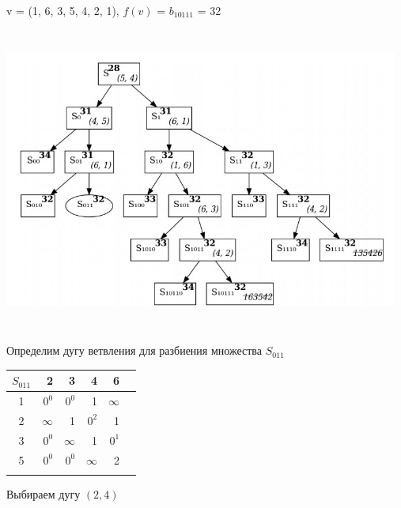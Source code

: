 \documentclass[12pt]{article}
\begin{document}
v = (1, 6, 3, 5, 4, 2, 1), $f(v)$ = $b_{10111}$  = 32\\
\begin{flushleft}
 
\includegraphics[width = 13cm, height = 10cm]{pictures/picture_06.jpg}\\
\end{flushleft}
\vspace{3cm}
\begin{flushleft}
 
Определим дугу ветвления для разбиения множества $S_{011}$\\
\end{flushleft}

\begin{flushleft}
\begin{tabular}{c||rrrr||c}
$S_{011}$  &2 & 3 & 4 & 6 & \\
\hline
\hline
1 &  $0^0$ & $0^0$ & 1  & $\infty$ & \\
2 &  $\infty$ & 1 & $0^2$  & 1 & \\
3 &  $0^0$ & $\infty$ & 1  & $0^1$ & \\
5 &  $0^0$ & $0^0$ & $\infty$  & 2 \\
\hline
\hline
 &  &  &  & \\
\end{tabular}
\end{flushleft}

Выбираем дугу $(2,4)$
\end{document}
